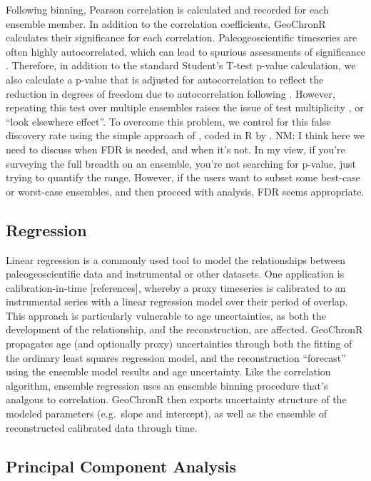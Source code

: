 \documentclass[gc, manuscript]{copernicus}
\begin{document}
Following binning, Pearson correlation is calculated and recorded for each ensemble member.
In addition to the correlation coefficients, GeoChronR calculates their significance for each correlation.
Paleogeoscientific timeseries are often highly autocorrelated, which can lead to spurious assessments of significance \citep{Hu_epsl17}.
Therefore, in addition to the standard Student's T-test p-value calculation, we also calculate a p-value that is adjusted for autocorrelation to reflect the reduction in degrees of freedom due to autocorrelation following \citet{bretherton1999}.
However, repeating this test over multiple ensembles raises the issue of test multiplicity \citep{Ventura2004}, or ``look elsewhere effect''.
To overcome this problem, we control for this false discovery rate using the simple approach of \citet{BenjaminiHochberg95}, coded in R by \citet{Ventura2004}.
NM: I think here we need to discuss when FDR is needed, and when it's not. In my view, if you're surveying the full breadth on an ensemble, you're not searching for p-value, just trying to quantify the range. However, if the users want to subset some best-case or worst-case ensembles, and then proceed with analysis, FDR seems appropriate.

\subsection{Regression}

Linear regression is a commonly used tool to model the relationships between paleogeoscientific data and instrumental or other datasets.
One application is calibration-in-time {[}references{]}, whereby a proxy timeseries is calibrated to an instrumental series with a linear regression model over their period of overlap.
This approach is particularly vulnerable to age uncertainties, as both the development of the relationship, and the reconstruction, are affected.
GeoChronR propagates age (and optionally proxy) uncertainties through both the fitting of the ordinary least squares regression model, and the reconstruction ``forecast'' using the ensemble model results and age uncertainty.
Like the correlation algorithm, ensemble regression uses an ensemble binning procedure that's analgous to correlation.
GeoChronR then exports uncertainty structure of the modeled parameters (e.g.~slope and intercept), as well as the ensemble of reconstructed calibrated data through time.

\subsection{Principal Component Analysis}
\end{document}
